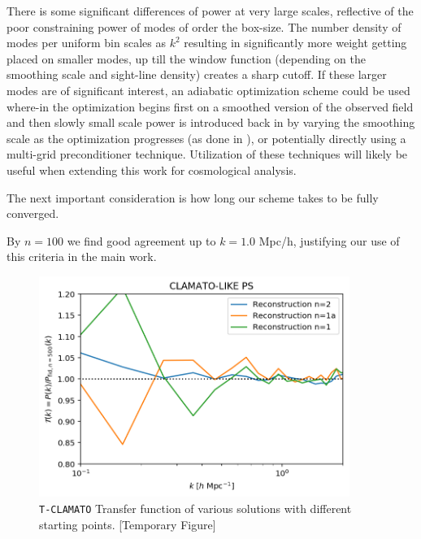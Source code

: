 \documentclass[times]{aastex62}
\begin{document}
There is some significant differences of power at very large scales, reflective of the poor constraining power of modes of order the box-size. The number density of modes per uniform bin scales as $k^2$ resulting in significantly more weight getting placed on smaller modes, up till the window function (depending on the smoothing scale and sight-line density) creates a sharp cutoff. If these larger modes are of significant interest, an adiabatic optimization scheme could be used where-in the optimization begins first on a smoothed version of the observed field and then slowly small scale power is introduced back in by varying the smoothing scale as the optimization progresses (as done in \cite{2018fengseljakzaldarriaga}), or potentially directly using a multi-grid preconditioner technique.\cite{2007multigrid} Utilization of these techniques will likely be useful when extending this work for cosmological analysis.

The next important consideration is how long our scheme takes to be fully converged.

By $n=100$ we find good agreement up to $k = 1.0$ Mpc/h, justifying our use of this criteria in the main work.


\begin{figure}
  \centering  \includegraphics[trim=0cm 0cm 0cm 0cm,width=0.90\textwidth]{./appendix_figures/different_starts.png}
    \caption{\texttt{T-CLAMATO} Transfer function of various solutions with different starting points. [Temporary Figure]} 
    \label{appfig_startingpoints}
\end{figure}
\end{document}
